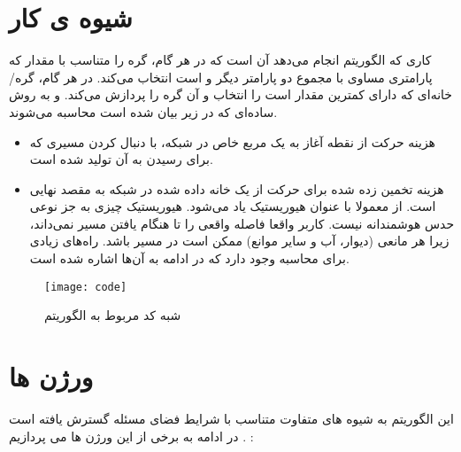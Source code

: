 \section{شیوه ی کار}
کاری که الگوریتم  انجام می‌دهد آن است که در هر گام، گره را متناسب با مقدار 
که پارامتری مساوی با مجموع دو پارامتر دیگر  و  است انتخاب می‌کند. در هر گام، گره/خانه‌ای که دارای کمترین مقدار است را انتخاب و آن گره را پردازش می‌کند.  و  به روش ساده‌ای که در زیر بیان شده است محاسبه می‌شوند.
\begin{itemize}
	\item{}
	 هزینه حرکت از نقطه آغاز به یک مربع خاص در شبکه، با دنبال کردن مسیری که برای رسیدن به آن تولید شده است.
		\item{}
		 هزینه تخمین زده شده برای حرکت از یک خانه داده شده در شبکه به مقصد نهایی است. از  معمولا با عنوان هیوریستیک یاد می‌شود. هیوریستیک چیزی به جز نوعی حدس هوشمندانه نیست. کاربر واقعا فاصله واقعی را تا هنگام یافتن مسیر نمی‌داند، زیرا هر مانعی (دیوار، آب و سایر موانع) ممکن است در مسیر باشد. راه‌های زیادی برای محاسبه  وجود دارد که در ادامه به آن‌ها اشاره شده است.
\end{itemize}
\begin{figure}[h]
	\texttt{[image: code]}
	\centering
	\caption{ شبه کد مربوط به الگوریتم }
	\cite{paliwal2023survey}
	\label{improved}
\end{figure}

\section{ورژن ها}
این الگوریتم به شیوه های متفاوت متناسب با شرایط فضای مسئله گسترش یافته است . در ادامه به برخی از این ورژن ها می پردازیم :






